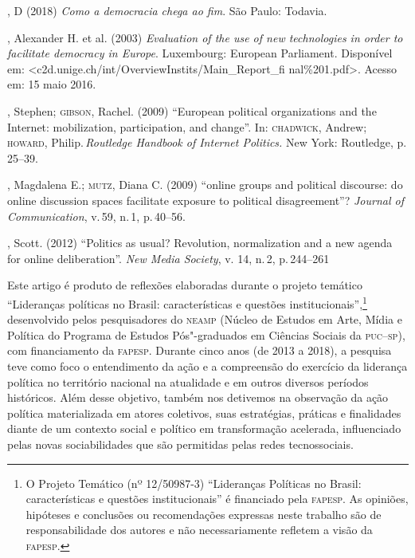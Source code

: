 \begin{bibliohedra}
, D (2018) \emph{Como a democracia chega ao fim}. São Paulo:
Todavia.

, Alexander H. et al. (2003) \emph{Evaluation of the use of new
technologies in order to facilitate democracy in Europe}. Luxembourg:
European Parliament. Disponível em:
\textless{}c2d.unige.ch/int/OverviewInstits/Main\_Report\_fi
nal\%201.pdf\textgreater{}. Acesso em: 15 maio 2016.

, Stephen; \textsc{gibson}, Rachel. (2009) ``European political organizations
and the Internet: mobilization, participation, and change''. In:
\textsc{chadwick}, Andrew; \textsc{howard}, Philip.\,\emph{Routledge Handbook of Internet
Politics.} New York: Routledge, p.\,25--39.

, Magdalena E.; \textsc{mutz}, Diana C. (2009) ``online groups and
political discourse: do online discussion spaces facilitate exposure to
political disagreement''? \emph{Journal of Communication}, v.\,59, n.\,1,
p.\,40--56.

, Scott. (2012) ``Politics as usual? Revolution, normalization and
a new agenda for online deliberation''. \emph{New Media Society}, v.
14, n.\,2, p.\,244--261
\end{bibliohedra}


\begin{flushright}
\end{flushright}


\noindent{}Este artigo é produto de reflexões elaboradas durante o projeto temático
``Lideranças políticas no Brasil: características e questões
institucionais'',\footnote{O Projeto Temático (nº 12/50987-3)
  ``Lideranças Políticas no Brasil: características e questões
  institucionais'' é financiado pela \textsc{fapesp}. As opiniões, hipóteses e
  conclusões ou recomendações expressas neste trabalho são de
  responsabilidade dos autores e não necessariamente refletem a visão da
  \textsc{fapesp}.} desenvolvido pelos pesquisadores do \textsc{neamp} (Núcleo de Estudos
em Arte, Mídia e Política do Programa de Estudos Pós"-graduados em
Ciências Sociais da \textsc{puc--sp}), com financiamento da \textsc{fapesp}. Durante cinco
anos (de 2013 a 2018), a pesquisa teve como foco o entendimento da ação
e a compreensão do exercício da liderança política no território
nacional na atualidade e em outros diversos períodos históricos. Além
desse objetivo, também nos detivemos na observação da ação política
materializada em atores coletivos, suas estratégias, práticas e
finalidades diante de um contexto social e político em transformação
acelerada, influenciado pelas novas sociabilidades que são permitidas
pelas redes tecnossociais.

